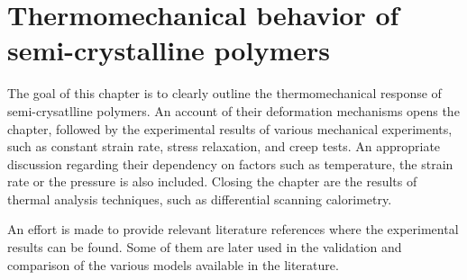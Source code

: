 \chapter{Thermomechanical behavior of semi-crystalline polymers} \label{ch:thermomechanical_behavior_semi_crystalline_polymer}









The goal of this chapter is to clearly outline the thermomechanical response of semi-crysatlline polymers.
An account of their deformation mechanisms opens the chapter, followed by the experimental results of various mechanical experiments, such as constant strain rate, stress relaxation, and creep tests.
An appropriate discussion regarding their dependency on factors such as temperature, the strain rate or the pressure is also included.
Closing the chapter are the results of thermal analysis techniques, such as differential scanning calorimetry.

An effort is made to provide relevant literature references where the experimental results can be found.
Some of them are later used in the validation and comparison of the various models available in the literature.


